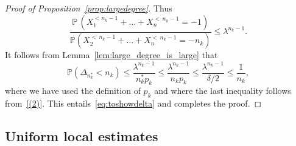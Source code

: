 \documentclass[10pt]{amsart}
\theoremstyle{definition}\newtheorem{defi}[theo]{Definition}\newtheorem{rema}[theo]{Remark}\newtheorem{exam}[theo]{Example}\newtheorem{exem}[theo]{Example}\newtheorem{nota}[theo]{Notation}
\renewcommand{\P}{\mathbb{P}}
\begin{document}
\begin{proof}[Proof of Proposition~\ref{prop:largedegree}]
Thus
\[
\frac{ \P\,\left(X^{<n_k-1}_1+\dots+X^{<\,n_k-1}_n=-1\right)}{\P\left(X^{<\,n_k-1}_2+\dots+X^{<\,n_k-1}_n=-n_k\right)}\leq \lambda^{n_{k}-1}.
\]
It follows from Lemma~\ref{lem:large_degree_is_large} that
\[
\P\left(\Delta_{n_{k}^*}< n_{k}\right) {\leq \frac{\lambda^{n_{k}-1} }{{n_{k}^*} p_{k}} \leq \frac{ \lambda^{n_{k}-1} }{n_{k} p_{k}} \leq} \frac{ \lambda^{n_{k}-1} }{\delta/2}\leq \frac{1}{n_{k}},
\]
where we have used the definition of $p_{k}$ and where the {last} inequality follows from~\eqref{(2)}. This entails~\eqref{eq:toshowdelta} and completes the proof.
\end{proof}


\subsection{Uniform local estimates}
\end{document}
